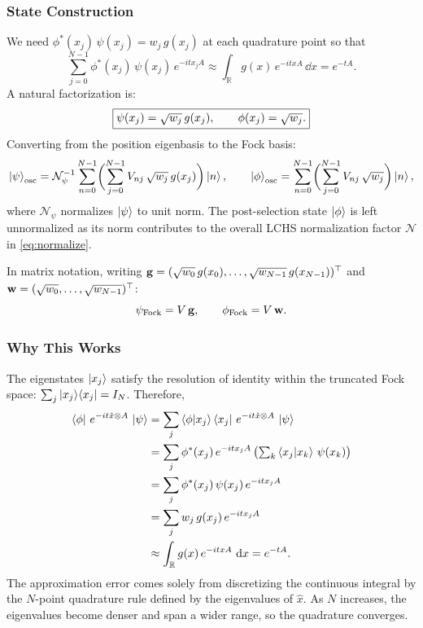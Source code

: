 \documentclass[11pt]{article}
\begin{document}
\subsubsection{State Construction}

We need $\phi^*(x_j)\,\psi(x_j) = w_j\,g(x_j)$ at each quadrature point so
that
\begin{equation}
  \sum_{j=0}^{N-1} \phi^*(x_j)\,\psi(x_j)\,e^{-itx_j A}
  \approx \int_{\mathbb{R}} g(x)\,e^{-itxA}\,\dd{x} = e^{-tA}.
\end{equation}
A natural factorization is:
\begin{equation}\label{eq:factorize}
  \boxed{%
    \psi(x_j) = \sqrt{w_j}\,g(x_j), \qquad
    \phi(x_j) = \sqrt{w_j}.}
\end{equation}
Converting from the position eigenbasis to the Fock basis:
\begin{equation}\label{eq:fock-conversion}
  \ket{\psi}_{\mathrm{osc}} = \mathcal{N}_\psi^{-1}
  \sum_{n=0}^{N-1}\biggl(\sum_{j=0}^{N-1} V_{nj}\,\sqrt{w_j}\,g(x_j)\biggr)
  \ket{n},
  \qquad
  \ket{\phi}_{\mathrm{osc}} =
  \sum_{n=0}^{N-1}\biggl(\sum_{j=0}^{N-1} V_{nj}\,\sqrt{w_j}\biggr)\ket{n},
\end{equation}
where $\mathcal{N}_\psi$ normalizes $\ket{\psi}$ to unit norm. The
post-selection state $\ket{\phi}$ is left unnormalized as its norm contributes
to the overall LCHS normalization factor $\mathcal{N}$ in \cref{eq:normalize}.

In matrix notation, writing $\vb{g} = (\sqrt{w_0}\,g(x_0),\ldots,
\sqrt{w_{N-1}}\,g(x_{N-1}))^\top$ and
$\vb{w} = (\sqrt{w_0},\ldots,\sqrt{w_{N-1}})^\top$:
\begin{equation}
  \psi_{\mathrm{Fock}} = V\,\vb{g}, \qquad
  \phi_{\mathrm{Fock}} = V\,\vb{w}.
\end{equation}

\subsubsection{Why This Works}

The eigenstates $\ket{x_j}$ satisfy the resolution of identity within the
truncated Fock space: $\sum_j \ket{x_j}\!\bra{x_j} = I_N$.  Therefore,
\begin{align}
  \bra{\phi}\,e^{-it\hat{x}\otimes A}\,\ket{\psi}
  &= \sum_j \bra{\phi}\ket{x_j}\bra{x_j}\,
     e^{-it\hat{x}\otimes A}\,\ket{\psi} \notag\\
  &= \sum_j \phi^*(x_j)\,e^{-itx_j A}\,
     \bigl(\textstyle\sum_k \braket{x_j}{x_k}\,\psi(x_k)\bigr) \notag\\
  &= \sum_j \phi^*(x_j)\,\psi(x_j)\,e^{-itx_j A} \notag\\
  &= \sum_j w_j\,g(x_j)\,e^{-itx_j A} \label{eq:quadrature-sum}\\
  &\approx \int_{\mathbb{R}} g(x)\,e^{-itxA}\,\dd{x}
   = e^{-tA}. \notag
\end{align}
The approximation error comes solely from discretizing the continuous
integral by the $N$-point quadrature rule defined by the eigenvalues of
$\hat{x}$.  As $N$ increases, the eigenvalues become denser and span a
wider range, so the quadrature converges.
\end{document}
